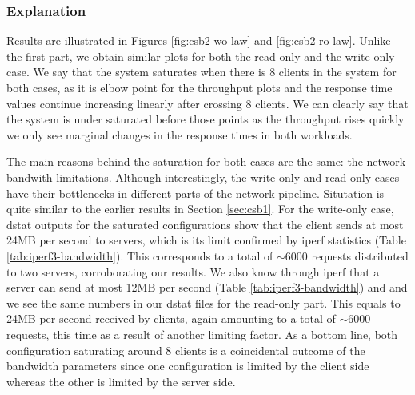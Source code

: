 \documentclass[11pt,a4paper]{article}
\begin{document}
\subsubsection{Explanation} \label{sec:csb2-exp}
Results are illustrated in Figures \ref{fig:csb2-wo-law} and \ref{fig:csb2-ro-law}. Unlike the first part, we obtain similar plots for both the read-only and the write-only case. We say that the system saturates when there is 8 clients in the system for both cases, as it is elbow point for the throughput plots and the response time values continue increasing linearly after crossing 8 clients. We can clearly say that the system is under saturated before those points as the throughput rises quickly we only see marginal changes in the response times in both workloads.
\par The main reasons behind the saturation for both cases are the same: the network bandwith limitations. Although interestingly, the write-only and read-only cases have their bottlenecks in different parts of the network pipeline. Situtation is quite similar to the earlier results in Section \ref{sec:csb1}. For the write-only case, dstat outputs for the saturated configurations show that the client sends at most 24MB per second to servers, which is its limit confirmed by iperf statistics (Table \ref{tab:iperf3-bandwidth}). This corresponds to a total of $\sim 6000$ requests distributed to two servers, corroborating our results. We also know through iperf that a server can send at most 12MB per second (Table \ref{tab:iperf3-bandwidth}) and and we see the same numbers in our dstat files for the read-only part. This equals to 24MB per second received by clients, again amounting to a total of $\sim 6000$ requests, this time as a result of another limiting factor. As a bottom line, both configuration saturating around 8 clients is a coincidental outcome of the bandwidth parameters since one configuration is limited by the client side whereas the other is limited by the server side.
\end{document}
